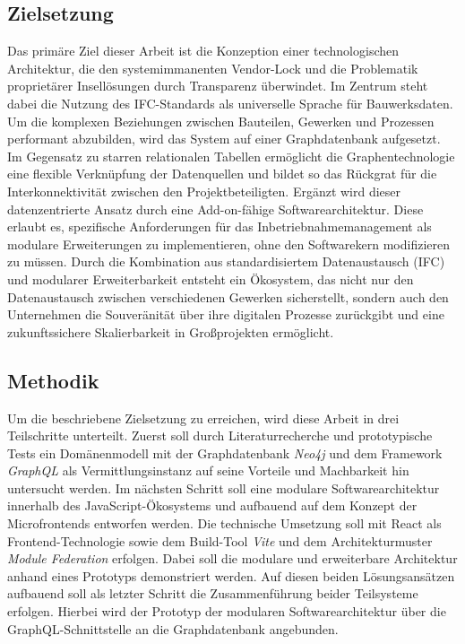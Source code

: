 \subsection{Zielsetzung}
Das primäre Ziel dieser Arbeit ist die Konzeption einer technologischen Architektur,
die den systemimmanenten Vendor-Lock und die Problematik proprietärer Insellösungen durch Transparenz überwindet.
Im Zentrum steht dabei die Nutzung des \ac{IFC}-Standards als universelle Sprache für Bauwerksdaten.
Um die komplexen Beziehungen zwischen Bauteilen, Gewerken und Prozessen performant abzubilden,
wird das System auf einer Graphdatenbank aufgesetzt. Im Gegensatz zu starren relationalen Tabellen
ermöglicht die Graphentechnologie eine flexible Verknüpfung der Datenquellen und bildet so das Rückgrat
für die Interkonnektivität zwischen den Projektbeteiligten.
Ergänzt wird dieser datenzentrierte Ansatz durch eine Add-on-fähige Softwarearchitektur.
Diese erlaubt es, spezifische Anforderungen für das Inbetriebnahmemanagement als modulare Erweiterungen zu implementieren,
ohne den Softwarekern modifizieren zu müssen. Durch die Kombination aus standardisiertem Datenaustausch (\ac{IFC}) und modularer Erweiterbarkeit
entsteht ein Ökosystem, das nicht nur den Datenaustausch zwischen verschiedenen Gewerken sicherstellt, sondern auch den Unternehmen die
Souveränität über ihre digitalen Prozesse zurückgibt und eine zukunftssichere Skalierbarkeit in Großprojekten ermöglicht.
\subsection{Methodik}
Um die beschriebene Zielsetzung zu erreichen, wird diese Arbeit in drei Teilschritte unterteilt. Zuerst soll durch Literaturrecherche und prototypische Tests ein Domänenmodell mit der Graphdatenbank \textit{Neo4j} und dem \gls{Framework} \textit{GraphQL} als Vermittlungsinstanz
auf seine Vorteile und Machbarkeit hin untersucht werden. Im nächsten Schritt soll eine modulare Softwarearchitektur innerhalb des JavaScript-Ökosystems und aufbauend auf dem Konzept der Microfrontends entworfen werden. Die technische Umsetzung soll mit React als Frontend-Technologie
sowie dem Build-Tool \textit{Vite} und dem Architekturmuster \textit{Module Federation} erfolgen. Dabei soll die modulare und erweiterbare Architektur anhand eines Prototyps demonstriert werden.
Auf diesen beiden Lösungsansätzen aufbauend soll als letzter Schritt die Zusammenführung beider Teilsysteme erfolgen. Hierbei wird der Prototyp der modularen Softwarearchitektur über die GraphQL-Schnittstelle an die Graphdatenbank angebunden.